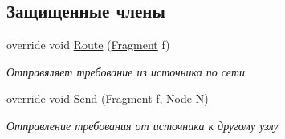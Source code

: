 \subsection*{Защищенные члены}
\begin{DoxyCompactItemize}
\item 
override void \hyperlink{class_network_simulator_1_1_source_node_a459050a9d3f549d88bcd761d90f9aa70}{Route} (\hyperlink{class_network_simulator_1_1_fragment}{Fragment} f)
\begin{DoxyCompactList}\small\item\em Отправяляет требование из источника по сети \end{DoxyCompactList}\item 
override void \hyperlink{class_network_simulator_1_1_source_node_a637485f5acd4714d619014fdb7581861}{Send} (\hyperlink{class_network_simulator_1_1_fragment}{Fragment} f, \hyperlink{class_network_simulator_1_1_node}{Node} N)
\begin{DoxyCompactList}\small\item\em Отправление требования от источника к другому узлу \end{DoxyCompactList}\end{DoxyCompactItemize}
